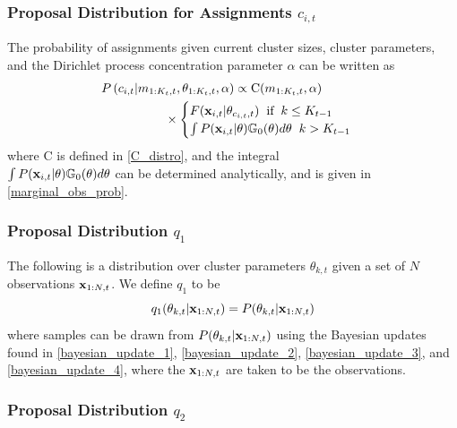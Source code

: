 \documentclass[twocolumn, final]{svjour3}
\begin{document}
\subsubsection{Proposal Distribution for Assignments $c_{i,t}$}
\label{sec:smc_proposal_1}

The probability of assignments given current cluster sizes, cluster parameters, and the Dirichlet process concentration parameter $\alpha$ can be written as
\begin{align}
\begin{split}
\label{smc_assig_eqn}
P &\left( c_{i,t} | m_{1:K_{t}, t}, \theta_{1:K_{t}, t}, \alpha \right) \propto
\text{C}(m_{1:K_{t}, t}, \alpha) \\ 
& \hspace{15mm}\times
\begin{cases}
F(\bold{x}_{i,t} | \theta_{c_{i,t},t}) \hspace{2mm} \text{if} \hspace{2mm} k \leq K_{t-1} \\
\int P(\bold{x}_{i,t} | \theta) \mathbb{G}_{0}(\theta)d\theta \hspace{2mm} k > K_{t-1}
\end{cases}
\end{split}
\end{align}
where C is defined in \eqref{C_distro}, and the integral \\
$\int P(\bold{x}_{i,t} | \theta) \mathbb{G}_{0}(\theta)d\theta$ can be determined analytically, and is given in \eqref{marginal_obs_prob}.


\subsubsection{Proposal Distribution $q_{1}$}
\label{sec:smc_proposal_2}

The following is a distribution over cluster parameters $\theta_{k,t}$ given a set of $N$ observations $\bold{x}_{1:N, t}$. We define $q_{1}$ to be
\begin{equation}
\label{smc_q1_eqn}
q_{1}(\theta_{k,t} | \bold{x}_{1:N,t}) = P(\theta_{k,t} | \bold{x}_{1:N,t})
\end{equation}
where samples can be drawn from $P(\theta_{k,t} | \bold{x}_{1:N,t})$ using the Bayesian updates found in \eqref{bayesian_update_1}, \eqref{bayesian_update_2}, \eqref{bayesian_update_3}, and \eqref{bayesian_update_4}, where the $\bold{x}_{1:N,t}$ are taken to be the observations.


\subsubsection{Proposal Distribution $q_{2}$}
\label{sec:smc_proposal_3}
\end{document}
